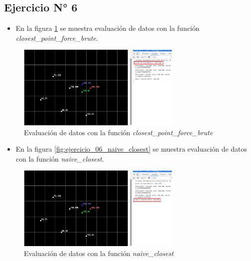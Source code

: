 \documentclass{article}
\begin{document}
\subsection{Ejercicio N° 6}
\begin{itemize}
	\item En la figura \ref{fig:ejercicio_06_closest_point_brute_force} se muestra evaluación de datos con la función \textit{closest\_point\_force\_brute}.
\end{itemize}
\begin{figure}[h!]
	\centering
	\includegraphics[width=0.7\textwidth]{img/ejercicio_06_closest_point_brute_force.png}
	\caption{Evaluación de datos con la función \textit{closest\_point\_force\_brute}}
	\label{fig:ejercicio_06_closest_point_brute_force}
\end{figure}

\begin{itemize}
	\item En la figura \ref{fig:ejercicio_06_naive_closest} se muestra evaluación de datos con la función \textit{naive\_closest}.
\end{itemize}
\begin{figure}[h!]
	\centering
	\includegraphics[width=0.7\textwidth]{img/jercicio_06_naive_closest.png}
	\caption{Evaluación de datos con la función \textit{naive\_closest}}
	\label{fig:jercicio_06_naive_closest}
\end{figure}

\clearpage
\end{document}
